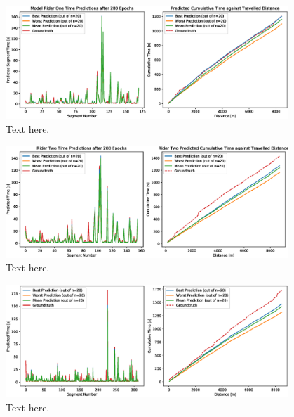 \documentclass[a4paper, 10pt]{article}
\numberwithin{equation}{section}
\begin{document}
 \begin{figure}[h!]
    \centering
    \includegraphics[width=0.95\textwidth]{images/NN_ANN/time_pred_r1.eps}
    \caption{Text here.}
    \label{fig:nn:time_pred_r1}
\end{figure}

 \begin{figure}[h!]
    \centering
    \includegraphics[width=0.95\textwidth]{images/NN_ANN/time_pred_r2.eps}
    \caption{Text here.}
    \label{fig:nn:time_pred_r2}
\end{figure}

 \begin{figure}[h!]
    \centering
    \includegraphics[width=0.95\textwidth]{images/NN_ANN/time_pred_r3.eps}
    \caption{Text here.}
    \label{fig:nn:time_pred_r3}
\end{figure}
\end{document}
